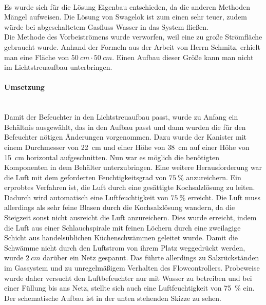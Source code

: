 \hfill \\

Es wurde sich für die Lösung Eigenbau entschieden, da die anderen Methoden Mängel aufweisen. Die Lösung von Swagelok ist zum einen sehr teuer, zudem würde bei abgeschaltetem Gasfluss Wasser in das System fließen. \\
Die Methode des Vorbeiströmens wurde verworfen, weil eine zu große Strömfläche gebraucht wurde. Anhand der Formeln aus der Arbeit von Herrn Schmitz, erhielt man eine Fläche von $\SI{50}{cm} \cdot \SI{50}{cm}$. Einen Aufbau dieser Größe kann man nicht im Lichtstreuaufbau unterbringen.

\paragraph{Umsetzung}

\hfill \\

Damit der Befeuchter in den Lichtstreuaufbau passt, wurde zu Anfang ein Behältnis ausgewählt, das in den Aufbau passt und dann wurden die für den Befeuchter nötigen Änderungen vorgenommen. Dazu wurde der Kanister mit einem Durchmesser von \SI{22}{cm} und einer Höhe von \SI{38}{cm} auf einer Höhe von \SI{15}{cm} horizontal aufgeschnitten. Nun war es möglich die benötigten Komponenten in dem Behälter unterzubringen. Eine weitere Herausforderung war die Luft mit dem geforderten Feuchtigkeitsgrad von $\SI{75}{\%}$ anzureichern. Ein erprobtes Verfahren ist, die Luft durch eine gesättigte Kochsalzlösung zu leiten. Dadurch wird automatisch eine Luftfeuchtigkeit von $\SI{75}{\%}$ erreicht. Die Luft muss allerdings als sehr feine Blasen durch die Kochsalzlösung wandern, da die Steigzeit sonst nicht ausreicht die Luft anzureichern. 
Dies wurde erreicht, indem die Luft aus einer Schlauchspirale mit feinen Löchern durch eine zweilagige Schicht aus handelsüblichen Küchenschwämmen geleitet wurde.
Damit die Schwämme nicht durch den Luftstrom von ihrem Platz weggedrückt werden, wurde $\SI{2}{cm}$ darüber ein Netz gespannt. Das führte allerdings zu Salzrückständen im Gassystem und zu unregelmäßigem Verhalten des Flowcontrollers. Probeweise wurde daher versucht den Luftbefeuchter nur mit Wasser zu betreiben und bei einer Füllung bis ans Netz, stellte sich auch eine Luftfeuchtigkeit von \SI{75}{\%} ein. Der schematische Aufbau ist in der unten stehenden Skizze zu sehen. \\

